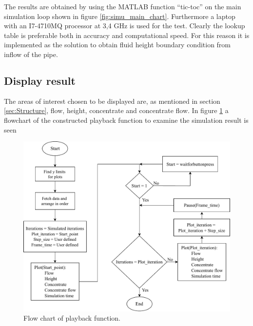 The results are obtained by using the MATLAB function ``tic-toc'' on the main simulation loop shown in figure \ref{fig:simu_main_chart}. Furthermore a laptop with an I7-4710MQ processor at 3,4 GHz is used for the test. Clearly the lookup table is preferable both in accuracy and computational speed. For this reason it is implemented as the solution to obtain fluid height boundary condition from inflow of the pipe.

\subsection*{Display result}

The areas of interest chosen to be displayed are, as mentioned in section \ref{sec:Structure}, flow, height, concentrate and concentrate flow.
In figure \ref{fig:data_plot_chart} a flowchart of the constructed playback function to examine the simulation result is seen 

\begin{figure}[H]
\centering
\includegraphics[width=0.9 \textwidth]{report/simulation/pictures/data_plot_chart.pdf}
\caption{Flow chart of playback function.}
\label{fig:data_plot_chart}
\end{figure}

